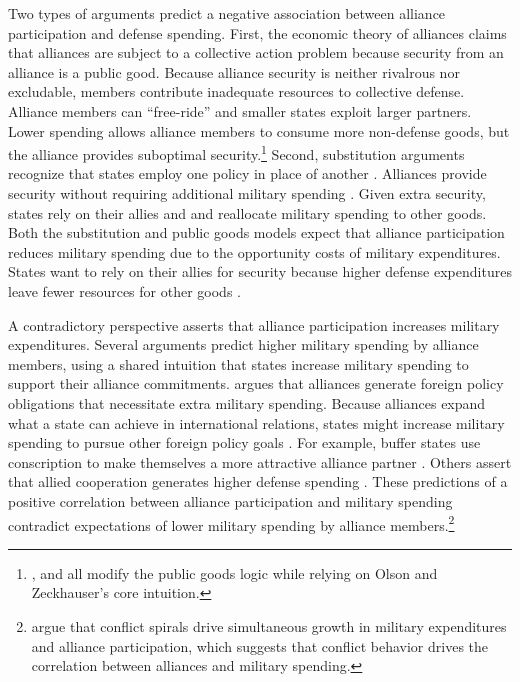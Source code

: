 \documentclass[12pt]{article}
\begin{document}
Two types of arguments predict a negative association between alliance participation and defense spending. 
First, the economic theory of alliances \citep{OlsonZeckhauser1966} claims that alliances are subject to a collective action problem because security from an alliance is a public good.
Because alliance security is neither rivalrous nor excludable, members contribute inadequate resources to collective defense. 
Alliance members can ``free-ride'' and smaller states exploit larger partners. 
Lower spending allows alliance members to consume more non-defense goods, but the alliance provides suboptimal security.\footnote{\citet{SandlerForbes1980}, \citet{Oneal1990} and \citet{SandlerHartley2001} all modify the public goods logic while relying on Olson and Zeckhauser's core intuition.} 
Second, substitution arguments recognize that states employ one policy in place of another \citep{MostStarr1989}.
Alliances provide security without requiring additional military spending \citep{Morrow1993, Conybeare1994}. 
Given extra security, states rely on their allies and and reallocate military spending to other goods. 
Both the substitution and public goods models expect that alliance participation reduces military spending due to the opportunity costs of military expenditures. 
States want to rely on their allies for security because higher defense expenditures leave fewer resources for other goods \citep{Fordham1998, Fearon2018}.


A contradictory perspective asserts that alliance participation increases military expenditures. 
Several arguments predict higher military spending by alliance members, using a shared intuition that states increase military spending to support their alliance commitments. 
\citet{Diehl1994} argues that alliances generate foreign policy obligations that necessitate extra military spending.
Because alliances expand what a state can achieve in international relations, states might increase military spending to pursue other foreign policy goals \citep{MorganPalmer2006}.
For example, buffer states use conscription to make themselves a more attractive alliance partner \citep{Horowitzetal2017}.
Others assert that allied cooperation generates higher defense spending \citep{Palmer1990, QuirozFlores2011}. 
These predictions of a positive correlation between alliance participation and military spending contradict expectations of lower military spending by alliance members.\footnote{
\citet{SeneseVasquez2008} argue that conflict spirals drive simultaneous growth in military expenditures and alliance participation, which suggests that conflict behavior drives the correlation between alliances and military spending. 
}
\end{document}
